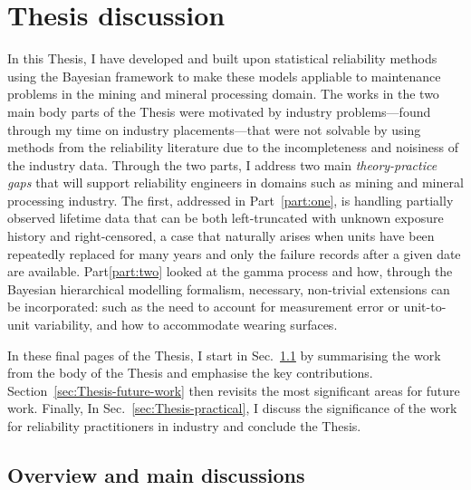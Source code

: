 \chapter{Thesis discussion}\label{chap:chapter7}

In this Thesis, I have developed and built upon statistical reliability methods using the Bayesian framework to make these models appliable to maintenance problems in the mining and mineral processing domain. The works in the two main body parts of the Thesis were motivated by industry problems---found through my time on industry placements---that were not solvable by using methods from the reliability literature due to the incompleteness and noisiness of the industry data. Through the two parts, I address two main \textit{theory-practice gaps} that will support reliability engineers in domains such as mining and mineral processing industry. The first, addressed in Part~\ref{part:one}, is handling partially observed lifetime data that can be both left-truncated with unknown exposure history and right-censored, a case that naturally arises when units have been repeatedly replaced for many years and only the failure records after a given date are available. Part\ref{part:two} looked at the gamma process and how, through the Bayesian hierarchical modelling formalism, necessary, non-trivial extensions can be incorporated: such as the need to account for measurement error or unit-to-unit variability, and how to accommodate wearing surfaces.

In these final pages of the Thesis, I start in Sec.~\ref{sec:thesis-summary} by summarising the work from the body of the Thesis and emphasise the key contributions. Section~\ref{sec:Thesis-future-work} then revisits the most significant areas for future work. Finally, In Sec.~\ref{sec:Thesis-practical}, I discuss the significance of the work for reliability practitioners in industry and conclude the Thesis.

\section{Overview and main discussions} \label{sec:thesis-summary}

